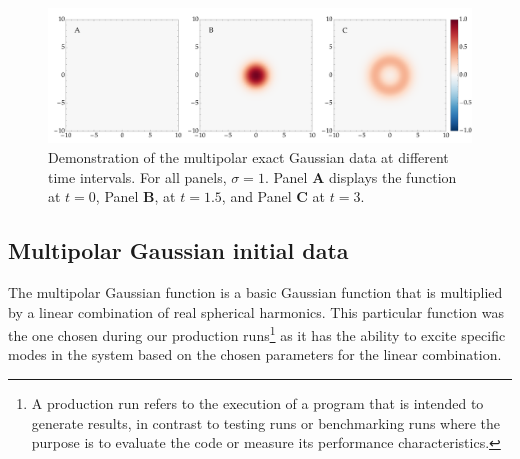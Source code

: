 \begin{figure}[!ht]
  \centering
  \includegraphics[width=\linewidth]{img/wave_scattering/exact_gaussian_id_examples.png}
  \caption{Demonstration of the multipolar exact Gaussian data at different time intervals. For all panels, $\sigma = 1$. Panel \textbf{A} displays the function at $t=0$, Panel \textbf{B}, at $t = 1.5$, and Panel \textbf{C} at $t=3$.}
  \label{fig:multipolar_exact_gaussian_id_demo}
\end{figure}

\subsection{Multipolar Gaussian initial data}

The multipolar Gaussian function is a basic Gaussian function that is multiplied by a linear combination of real spherical harmonics. This particular function was the one chosen during our production runs\footnote{A production run refers to the execution of a program that is intended to generate results, in contrast to testing runs or benchmarking runs where the purpose is to evaluate the code or measure its performance characteristics.} as it has the ability to excite specific modes in the system based on the chosen parameters for the linear combination.

